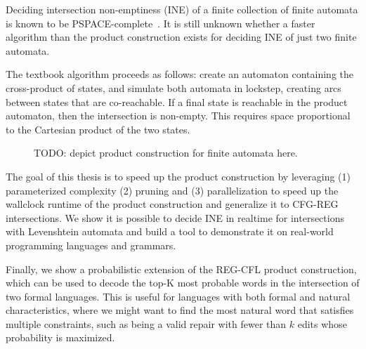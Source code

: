 Deciding intersection non-emptiness (INE) of a finite collection of finite automata is known to be PSPACE-complete~\cite{kozen1977lower}. It is still unknown whether a faster algorithm than the product construction exists for deciding INE of just two finite automata.

The textbook algorithm proceeds as follows: create an automaton containing the cross-product of states, and simulate both automata in lockstep, creating arcs between states that are co-reachable. If a final state is reachable in the product automaton, then the intersection is non-empty. This requires space proportional to the Cartesian product of the two states.

\begin{figure}[h]
  \caption{TODO: depict product construction for finite automata here.}
  \end{figure}

The goal of this thesis is to speed up the product construction by leveraging (1) parameterized complexity (2) pruning and (3) parallelization to speed up the wallclock runtime of the product construction and generalize it to CFG-REG intersections. We show it is possible to decide INE in realtime for intersections with Levenshtein automata and build a tool to demonstrate it on real-world programming languages and grammars.

Finally, we show a probabilistic extension of the REG-CFL product construction, which can be used to decode the top-K most probable words in the intersection of two formal languages. This is useful for languages with both formal and natural characteristics, where we might want to find the most natural word that satisfies multiple constraints, such as being a valid repair with fewer than $k$ edits whose probability is maximized.

\clearpage